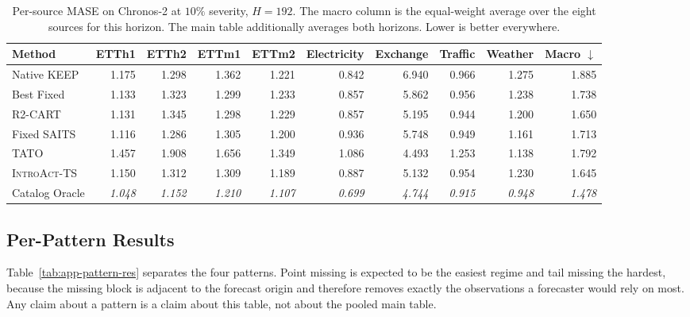 \documentclass{article}
\newcommand{\oracle}[1]{\textit{\textcolor{phgray}{#1}}}
\newcommand{\introact}{\textsc{IntroAct-TS}}
\begin{document}
\begin{table}[!t]
  \caption{Per-source MASE on Chronos-2 at $10\%$ severity, $H=192$. The macro column is the
  equal-weight average over the eight sources for this horizon. The main table additionally averages both horizons. Lower is better everywhere.}
  \label{tab:app-src-ch2-192}
  \centering
  \small
  \setlength{\tabcolsep}{3pt}
\begin{tabular*}{\textwidth}{@{\extracolsep{\fill}}lrrrrrrrrr@{}}
    \toprule
    Method & ETTh1 & ETTh2 & ETTm1 & ETTm2 & Electricity & Exchange & Traffic & Weather & Macro $\downarrow$ \\
    \midrule
    Native KEEP & 1.175 & 1.298 & 1.362 & 1.221 & 0.842 & 6.940 & 0.966 & 1.275 & 1.885 \\
    Best Fixed & 1.133 & 1.323 & 1.299 & 1.233 & 0.857 & 5.862 & 0.956 & 1.238 & 1.738 \\
    R2-CART & 1.131 & 1.345 & 1.298 & 1.229 & 0.857 & 5.195 & 0.944 & 1.200 & 1.650 \\
    Fixed SAITS & 1.116 & 1.286 & 1.305 & 1.200 & 0.936 & 5.748 & 0.949 & 1.161 & 1.713 \\
    TATO & 1.457 & 1.908 & 1.656 & 1.349 & 1.086 & 4.493 & 1.253 & 1.138 & 1.792 \\
    \midrule
    \rowcolor{bestgray}\introact{} & 1.150 & 1.312 & 1.309 & 1.189 & 0.887 & 5.132 & 0.954 & 1.230 & 1.645 \\
    \midrule
    Catalog Oracle & \oracle{1.048} & \oracle{1.152} & \oracle{1.210} & \oracle{1.107} & \oracle{0.699} & \oracle{4.744} & \oracle{0.915} & \oracle{0.948} & \oracle{1.478} \\
    \bottomrule
  \end{tabular*}
\end{table}

\subsection{Per-Pattern Results}
\label{app:pattern}
Table~\ref{tab:app-pattern-res} separates the four patterns. Point missing is expected to
be the easiest regime and tail missing the hardest, because the missing block is adjacent
to the forecast origin and therefore removes exactly the observations a forecaster would
rely on most. Any claim about a pattern is a claim about this table, not about the pooled
main table.
\end{document}
